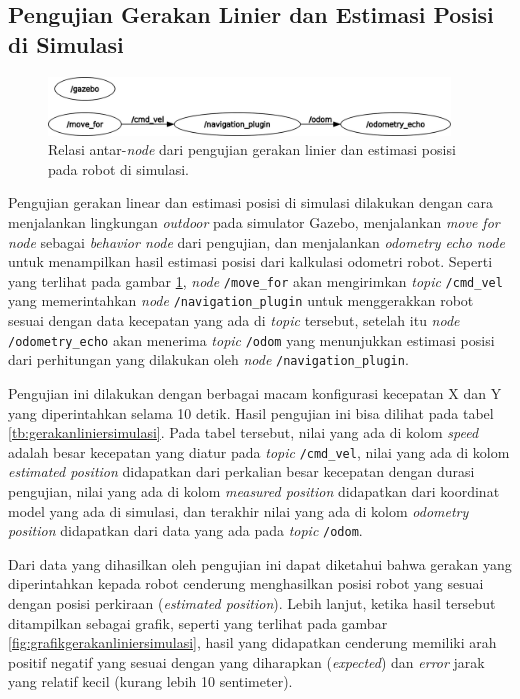 \subsection{Pengujian Gerakan Linier dan Estimasi Posisi di Simulasi}
\label{subsec:liniersimulasi}

\begin{figure}[ht]
  \centering
  \includegraphics[width=0.95\textwidth,keepaspectratio]{gambar/rosgraph-navigation-plugin.png}
  \caption{Relasi antar-\emph{node} dari pengujian gerakan linier dan estimasi posisi pada robot di simulasi.}
  \label{fig:rosgraphnavigationplugin}
\end{figure}

Pengujian gerakan linear dan estimasi posisi di simulasi dilakukan dengan cara menjalankan lingkungan \emph{outdoor} pada simulator Gazebo,
  menjalankan \emph{move for node} sebagai \emph{behavior node} dari pengujian,
  dan menjalankan \emph{odometry echo node} untuk menampilkan hasil estimasi posisi dari kalkulasi odometri robot.
Seperti yang terlihat pada gambar \ref{fig:rosgraphnavigationplugin},
  \emph{node} \lstinline{/move_for} akan mengirimkan \emph{topic} \lstinline{/cmd_vel} yang memerintahkan \emph{node} \lstinline{/navigation_plugin} untuk menggerakkan robot sesuai dengan data kecepatan yang ada di \emph{topic} tersebut,
  setelah itu \emph{node} \lstinline{/odometry_echo} akan menerima \emph{topic} \lstinline{/odom} yang menunjukkan estimasi posisi dari perhitungan yang dilakukan oleh \emph{node} \lstinline{/navigation_plugin}.



Pengujian ini dilakukan dengan berbagai macam konfigurasi kecepatan X dan Y yang diperintahkan selama 10 detik.
Hasil pengujian ini bisa dilihat pada tabel \ref{tb:gerakanliniersimulasi}.
Pada tabel tersebut, nilai yang ada di kolom \emph{speed} adalah besar kecepatan yang diatur pada \emph{topic} \lstinline{/cmd_vel},
  nilai yang ada di kolom \emph{estimated position} didapatkan dari perkalian besar kecepatan dengan durasi pengujian,
  nilai yang ada di kolom \emph{measured position} didapatkan dari koordinat model yang ada di simulasi,
  dan terakhir nilai yang ada di kolom \emph{odometry position} didapatkan dari data yang ada pada \emph{topic} \lstinline{/odom}.

Dari data yang dihasilkan oleh pengujian ini dapat diketahui bahwa gerakan yang diperintahkan kepada robot cenderung menghasilkan posisi robot yang sesuai dengan posisi perkiraan (\emph{estimated position}).
Lebih lanjut, ketika hasil tersebut ditampilkan sebagai grafik,
  seperti yang terlihat pada gambar \ref{fig:grafikgerakanliniersimulasi},
  hasil yang didapatkan cenderung memiliki arah positif negatif yang sesuai dengan yang diharapkan (\emph{expected}) dan \emph{error} jarak yang relatif kecil (kurang lebih 10 sentimeter).


